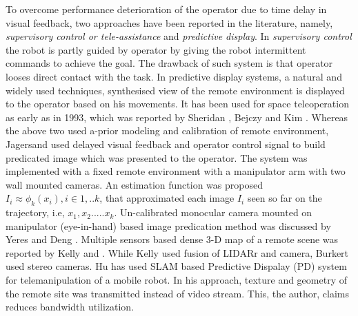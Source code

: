 To overcome performance deterioration of the operator due to time delay in visual feedback, two approaches have been reported in the literature, namely, \textit{supervisory control or tele-assistance  } and \textit{predictive display}. In \textit{supervisory control} \cite{sheridan1986human,pook1994teleassistance,jagersand1995visual} the robot is partly guided by operator by giving the robot intermittent commands to achieve the goal. The drawback of such system is that operator looses direct contact with the task.
In  predictive display systems, a natural and widely used techniques, synthesised view of the remote environment is displayed to the operator based on his movements. It has been used for space teleoperation as early as in 1993, which was reported by Sheridan \cite{sheridan1993space}, Bejczy \cite{bejczy1990predictive} and Kim \cite{kim1993demonstration}. Whereas the above two used a-prior modeling and  calibration of remote environment, Jagersand \cite{jagersand1999image} used delayed visual feedback and operator control signal to build predicated image which was presented to the operator. The system was implemented with a fixed remote environment with a manipulator arm with  two wall mounted cameras. An estimation function was proposed 
$I_i \approx \phi_k(x_i), i \in {1,..k}$, that approximated each image  $I_i$ seen so far on the trajectory, i.e, ${x_1, x_2 .....x_k}$. Un-calibrated monocular camera mounted on manipulator (eye-in-hand) based image predication method was discussed   by Yeres \cite{yerex2003predictive} and Deng \cite{deng2003predictive}. Multiple sensors based dense 3-D  map of a remote scene was reported by Kelly \cite{kelly2011real} and \cite{burkert2004photorealistic}. While Kelly used fusion of  LIDARr and  camera,  Burkert used stereo cameras. Hu \cite{hu2015line} has used SLAM based Predictive Dispalay  (PD) system for telemanipulation of a mobile robot. In his approach, texture and geometry of the remote site was transmitted instead of  video stream. This, the author, claims reduces bandwidth utilization.







